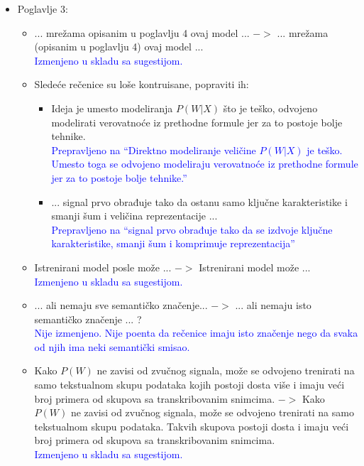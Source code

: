 \documentclass[a4paper]{report}
\newcommand{\odgovor}[1]{\textcolor{blue}{#1}}
\begin{document}
\begin{itemize}
  \item Poglavlje 3:
  \begin{itemize}
  \item ... mrežama opisanim u poglavlju 4 ovaj model ... $->$  ... mrežama (opisanim u poglavlju 4) ovaj model ...\\ \odgovor{Izmenjeno u skladu sa sugestijom.}
  \item Sledeće rečenice su loše kontruisane, popraviti ih:
  \begin{itemize}
      \item Ideja je umesto modeliranja $P(W|X)$ što je teško, odvojeno modelirati verovatnoće iz prethodne formule jer za to postoje bolje tehnike.\\ \odgovor{Prepravljeno na ``Direktno modeliranje veličine $P(W|X)$ je teško. Umesto toga se odvojeno modeliraju verovatnoće iz prethodne formule jer za to postoje bolje tehnike.''}
      \item ... signal prvo obrađuje tako da ostanu samo ključne karakteristike i smanji šum i veličina reprezentacije ... \\ \odgovor{Prepravljeno na ``signal prvo obrađuje tako da se izdvoje ključne karakteristike, smanji šum i komprimuje reprezentacija''}
  \end{itemize}
  \item Istrenirani model posle može ... $->$ Istrenirani model može ...\\ \odgovor{Izmenjeno u skladu sa sugestijom.}
  \item ... ali nemaju sve semantičko značenje... $->$ ... ali nemaju isto semantičko značenje ... ? \\ \odgovor{Nije izmenjeno. Nije poenta da rečenice imaju isto značenje nego da svaka od njih ima neki semantički smisao.}
  \item Kako $P(W)$ ne zavisi od zvučnog signala, može se odvojeno trenirati na samo tekstualnom skupu podataka kojih postoji dosta više i imaju veći broj primera od skupova sa transkribovanim snimcima. $->$
Kako $P(W)$ ne zavisi od zvučnog signala, može se odvojeno trenirati na samo tekstualnom skupu podataka. Takvih skupova postoji dosta i imaju veći broj primera od skupova sa transkribovanim snimcima. \\ \odgovor{Izmenjeno u skladu sa sugestijom.}
 \end{itemize}
\end{itemize}
\end{document}
